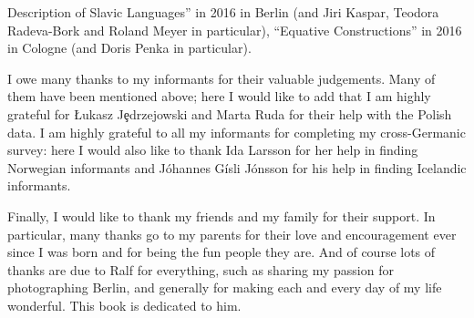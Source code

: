 \begin{refsection}
Description of Slavic Languages'' in 2016 in Berlin (and Jiri Kaspar, Teodora Radeva-Bork and Roland Meyer in particular), ``Equative Constructions'' in 2016 in Cologne (and Doris Penka in particular).

I owe many thanks to my informants for their valuable judgements. Many of them have been mentioned above; here I would like to add that I am highly grateful for \L{}ukasz J\c{e}drzejowski and Marta Ruda for their help with the Polish data. I am highly grateful to all my informants for completing my cross-Germanic survey: here I would also like to thank Ida Larsson for her help in finding Norwegian informants and J\'ohannes G\'isli J\'onsson for his help in finding Icelandic informants.

Finally, I would like to thank my friends and my family for their support. In particular, many thanks go to my parents for their love and encouragement ever since I was born and for being the fun people they are. And of course lots of thanks are due to Ralf for everything, such as sharing my passion for photographing Berlin, and generally for making each and every day of my life wonderful. This book is dedicated to him.



\printbibliography[heading=subbibliography]
\end{refsection}

